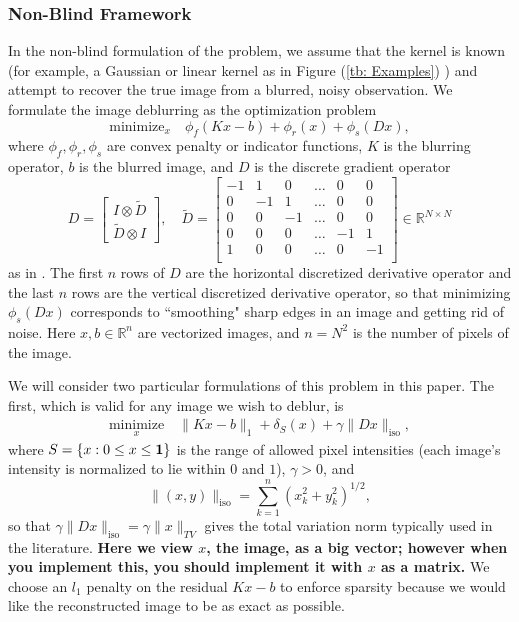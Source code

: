 \documentclass[12pt]{article}
\newcommand{\R}{\mathbb R}
\begin{document}
\subsubsection{Non-Blind Framework}
In the non-blind formulation of the problem, we assume that the kernel
is known (for example, a Gaussian or linear kernel as in Figure
(\ref{tb: Examples}) ) and attempt to recover the true image from a
blurred, noisy observation. We formulate the image deblurring as the optimization problem
\[ \text{minimize}_x \quad \phi_f (Kx-b) + \phi_r(x) + \phi_s(Dx), \]
where  $\phi_f, \phi_r, \phi_s$ are convex penalty or indicator functions, $K$ is the blurring operator, $b$ is the blurred image, and $D$ is the discrete gradient operator
\[ D = \left[ \begin{array}{c} I \otimes \tilde{D} \\ \tilde{D} \otimes I \end{array}\right], \quad
\tilde{D} = \left[ \begin{array}{cccccc} 
-1 & 1 & 0 & \ldots & 0 & 0 \\ 
0 &-1 & 1 & \ldots & 0 & 0 \\ 
0 & 0 &-1 & \ldots & 0 & 0 \\ 
0 & 0 & 0 & \ldots & -1 & 1\\ 
1 & 0 & 0 & \ldots & 0 & -1 \\
\end{array}\right] \in \R^{N \times N} \]
as in \cite{Vandenberghe14}. The first $n$ rows of $D$ are the horizontal discretized derivative operator and the last $n$ rows are the vertical discretized derivative operator, so that minimizing $\phi_s(Dx)$ corresponds to ``smoothing" sharp edges in an image and getting rid of noise. Here $x,b\in \R^n$ are vectorized images, and $n= N^2$ is the number of pixels of the image. 

We will consider two particular formulations of this problem in this paper. The first, which is valid for any image we wish to deblur, is    
\begin{align}
\underset{x}{\text{minimize}} \quad \| Kx-b \|_1 + \delta_S(x) + \gamma \|Dx \|_{\text{iso}},  \label{eq: improblem1} 
\end{align}
where $S = \{ x: 0 \le x \le {\bf 1} \}$ is the range of allowed pixel
intensities (each image's intensity is normalized to lie within $0$
and $1$), $\gamma >0$, and 
\[ \| (x,y) \|_{\text{iso}} = \sum_{k=1}^n (x_k^2 + y_k^2)^{1/2}, \]
so that $\gamma \|Dx\|_{\text{iso}} = \gamma \| x\|_{TV}$ gives the total variation norm typically used in the literature. \textbf{Here we view $x$, the image, as a big vector; however when you implement this, you should implement it with $x$ as a matrix.} We choose an $l_1$ penalty on the residual $Kx-b$ to enforce sparsity because we would like the reconstructed image to be as exact as possible.
\end{document}
